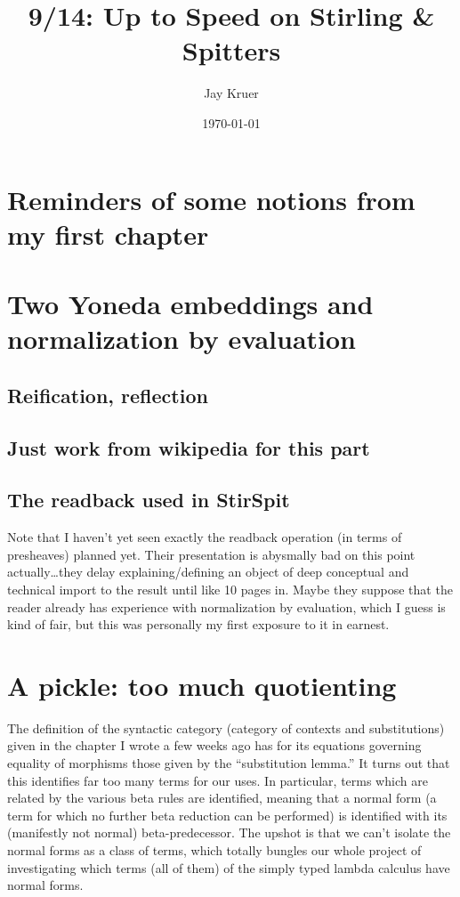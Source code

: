 \documentclass[11pt]{article}
\author{Jay Kruer}
\date{\today}
\title{9/14: Up to Speed on Stirling \& Spitters}
\begin{document}
\maketitle
\tableofcontents

\section{Reminders of some notions from my first chapter}
\label{sec:org06041dc}

\section{Two Yoneda embeddings and normalization by evaluation}
\label{sec:org0c26de1}
\subsection{Reification, reflection}
\label{sec:org522cba6}

\subsection{Just work from wikipedia for this part}
\label{sec:org0f74d22}

\subsection{The readback used in StirSpit}
\label{sec:org50edab0}
Note that I haven't yet seen exactly the readback operation (in terms of
presheaves) planned yet. Their presentation is abysmally bad on this point
actually\ldots{}they delay explaining/defining an object of deep conceptual and
technical import to the result until like 10 pages in. Maybe they suppose that
the reader already has experience with normalization by evaluation, which I
guess is kind of fair, but this was personally my first exposure to it in
earnest.

\section{A pickle: too much quotienting}
\label{sec:org5f4b0ea}
The definition of the syntactic category (category of contexts and
substitutions) given in the chapter I wrote a few weeks ago has for its
equations governing equality of morphisms those given by the ``substitution
lemma.'' It turns out that this identifies far too many terms for our uses. In
particular, terms which are related by the various beta rules are identified,
meaning that a normal form (a term for which no further beta reduction can be
performed) is identified with its (manifestly not normal) beta-predecessor. The
upshot is that we can't isolate the normal forms as a class of terms, which
totally bungles our whole project of investigating which terms (all of them) of
the simply typed lambda calculus have normal forms.
\end{document}
